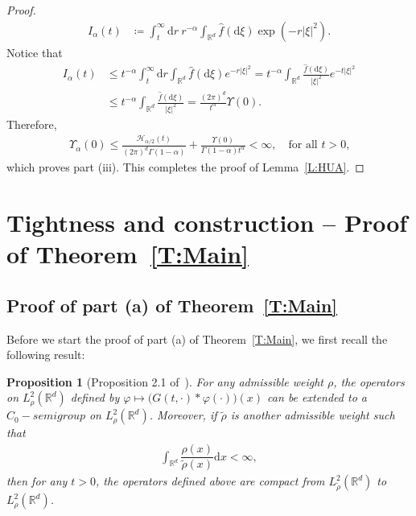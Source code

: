 \documentclass[sn-mathphys]{sn-jnl}%
\newcommand{\BR}{\mathbb{R}}
\newcommand{\ud}{\ensuremath{\mathrm{d}}}
\numberwithin{equation}{section}
\theoremstyle{thmstyleone}%
\newtheorem{proposition}[theorem]{Proposition}%
\theoremstyle{thmstyletwo}%
\theoremstyle{thmstylethree}%
\begin{document}
\begin{proof}
\begin{align*}
    I_\alpha(t)            & \coloneqq \int_t^\infty \ud r \: r^{-\alpha} \int_{\BR^d} \widehat{f}(\ud\xi)\exp\left(-r\lvert\xi\rvert^2\right).
  \end{align*}
  Notice that
  \begin{align*}
    I_\alpha(t)
    &\le t^{-\alpha} \int_t^\infty \ud r \int_{\BR^d} \widehat{f}(\ud\xi)e^{-r\lvert\xi\rvert^2}
    =   t^{-\alpha} \int_{\BR^d} \frac{\widehat{f}(\ud\xi)}{\lvert\xi\rvert^2} e^{-t\lvert\xi\rvert^2}\\
    &\le t^{-\alpha} \int_{\BR^d} \frac{\widehat{f}(\ud\xi)}{\lvert \xi \rvert^2}
    =   \frac{\left(2\pi\right)^d}{t^{\alpha}} \Upsilon(0).
  \end{align*}
  Therefore,
  \begin{align*}
    \Upsilon_{\alpha}(0) \le \frac{\mathcal{H}_{\alpha/2}(t)}{(2\pi)^d\Gamma(1-\alpha)} +
    \frac{\Upsilon(0)}{\Gamma\left(1-\alpha\right)t^{\alpha}} <\infty, \quad \text{for all $t>0$,}
  \end{align*}
  which proves part (iii). This completes the proof of Lemma~\ref{L:HUA}.
\end{proof}

\section{Tightness and construction -- Proof of Theorem~\ref{T:Main}}\label{S:mainproof}
\subsection{Proof of part (a) of Theorem~\ref{T:Main}}

Before we start the proof of part (a) of Theorem~\ref{T:Main}, we first recall the following result:

\begin{proposition}[Proposition 2.1 of~\cite{tessitore.zabczyk:98:invariant}]\label{P:weight}
  For any admissible weight $\rho$, the operators on $L^2_\rho(\BR^d)$ defined by $\varphi \mapsto
  \big(G(t,\cdot)*\varphi(\cdot)\big)(x)$ can be extended to a $C_0-semigroup$ on $L^2_\rho(\BR^d)$.
  Moreover, if $\tilde{\rho}$ is another admissible weight such that
	\begin{align*}
	\int_{\BR^d}\dfrac{\rho(x)}{\tilde{\rho}(x)}\ud x < \infty,
	\end{align*}
	then for any $t>0$, the operators defined above are compact from $L^2_{\tilde{\rho}}(\BR^d)$ to
	$L^2_\rho(\BR^d)$.
\end{proposition}
\end{document}
